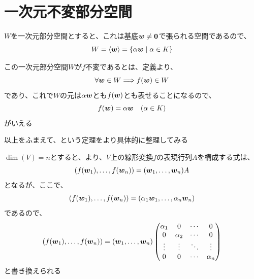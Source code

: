 \documentclass[../../../topic_linear-algebra]{subfiles}
\begin{document}
\sectionline
\section{一次元不変部分空間}\label{sec:1d-invariant-subspaces}

\begin{mindflow}
\end{mindflow}

$W$を一次元部分空間とすると、これは基底$\vb*{w} \neq \vb*{0}$で張られる空間であるので、
\begin{equation*}
  W = \langle \vb*{w} \rangle = \{ \alpha \vb*{w} \mid \alpha \in K \}
\end{equation*}

この一次元部分空間$W$が$f$不変であるとは、定義より、
\begin{equation*}
  \forall \vb*{w} \in W \Longrightarrow f(\vb*{w}) \in W
\end{equation*}
であり、これで$W$の元は$\alpha \vb*{w}$とも$f(\vb*{w})$とも表せることになるので、
\begin{equation*}
  f(\vb*{w}) = \alpha \vb*{w} \quad (\alpha \in K)
\end{equation*}
がいえる

\br

以上をふまえて、という定理をより具体的に整理してみる

\br

$\dim(V) = n$とすると、より、$V$上の線形変換$f$の表現行列$A$を構成する式は、
\begin{equation*}
  (f(\vb*{w}_1), \ldots, f(\vb*{w}_n)) = (\vb*{w}_1, \ldots, \vb*{w}_n) A
\end{equation*}
となるが、ここで、
\begin{equation*}
  (f(\vb*{w}_1), \ldots, f(\vb*{w}_n)) = (\alpha_1 \vb*{w}_1, \ldots, \alpha_n \vb*{w}_n)
\end{equation*}
であるので、
\begin{equation*}
  (f(\vb*{w}_1), \ldots, f(\vb*{w}_n)) = (\vb*{w}_1, \ldots, \vb*{w}_n) \begin{pmatrix}
    \alpha_1 & 0        & \cdots & 0        \\
    0        & \alpha_2 & \cdots & 0        \\
    \vdots   & \vdots   & \ddots & \vdots   \\
    0        & 0        & \cdots & \alpha_n
  \end{pmatrix}
\end{equation*}
と書き換えられる
\end{document}

